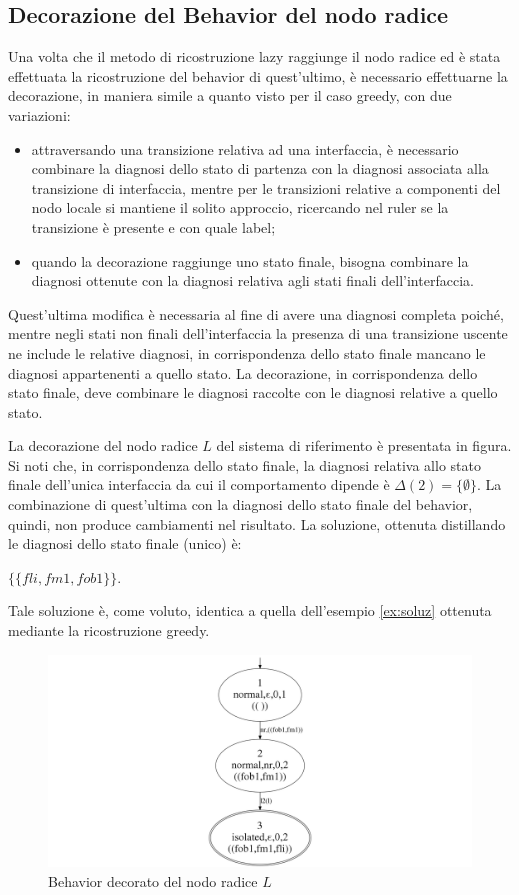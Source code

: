 \subsection{Decorazione del Behavior del nodo radice}
Una volta che il metodo di ricostruzione lazy raggiunge il nodo radice ed è stata effettuata la ricostruzione del behavior di quest'ultimo, è necessario effettuarne la decorazione, in maniera simile a quanto visto per il caso greedy, con due variazioni:
\begin{itemize}
\item attraversando una transizione relativa ad una interfaccia, è necessario combinare la diagnosi dello stato di partenza con la diagnosi associata alla transizione di interfaccia, mentre per le transizioni relative a componenti del nodo locale si mantiene il solito approccio, ricercando nel ruler se la transizione è presente e con quale label;
\item quando la decorazione raggiunge uno stato finale, bisogna combinare la diagnosi ottenute con la diagnosi relativa agli stati finali dell'interfaccia.
\end{itemize}
Quest'ultima modifica è necessaria al fine di avere una diagnosi completa poiché, mentre negli stati non finali dell'interfaccia la presenza di una transizione uscente ne include le relative diagnosi, in corrispondenza dello stato finale mancano le diagnosi appartenenti a quello stato. La decorazione, in corrispondenza dello stato finale, deve combinare le diagnosi raccolte con le diagnosi relative a quello stato.

\begin{ex}
La decorazione del nodo radice $L$ del sistema di riferimento è presentata in figura. Si noti che, in corrispondenza dello stato finale, la diagnosi relativa allo stato finale dell'unica interfaccia da cui il comportamento dipende è $\Delta(2) = \{\emptyset\}$. La combinazione di quest'ultima con la diagnosi dello stato finale del behavior, quindi, non produce cambiamenti nel risultato. 
La soluzione, ottenuta distillando le diagnosi dello stato finale (unico) è:
\begin{center}
 $\{\{fli,fm1,fob1\}\}$.
\end{center}
Tale soluzione è, come voluto, identica a quella dell'esempio \ref{ex:soluz} ottenuta mediante la ricostruzione greedy.
\end{ex}

\begin{figure}[htbp]
\centering
\includegraphics[scale=0.2]{./Img/sac/bhv_l.png}
\caption{Behavior decorato del nodo radice $L$}
\label{fig:bhv_l}
\end{figure}
